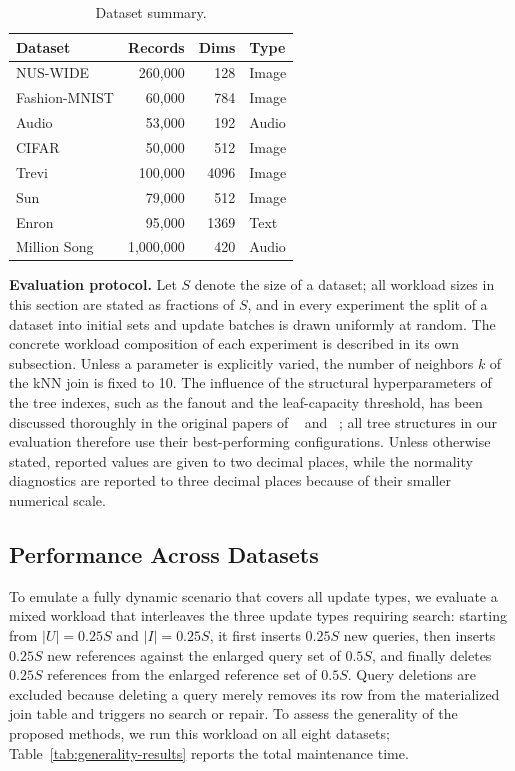 \begin{table}[t]
\centering
\caption{Dataset summary.}
\label{tab:dataset}
\begin{tabular*}{\columnwidth}{@{\extracolsep{\fill}}lrrl@{}}
\toprule
\textbf{Dataset} & \textbf{Records} & \textbf{Dims} & \textbf{Type}\\
\midrule
NUS-WIDE & 260,000 & 128 & Image\\
Fashion-MNIST & 60,000 & 784 & Image\\
Audio & 53,000 & 192 & Audio\\
CIFAR & 50,000 & 512 & Image\\
Trevi & 100,000 & 4096 & Image\\
Sun & 79,000 & 512 & Image\\
Enron & 95,000 & 1369 & Text\\
Million Song & 1,000,000 & 420 & Audio\\
\bottomrule
\end{tabular*}
\end{table}

\noindent\textbf{Evaluation protocol.}
Let $S$ denote the size of a dataset; all workload sizes in this section are stated as fractions of $S$, and in every experiment the split of a dataset into initial sets and update batches is drawn uniformly at random. The concrete workload composition of each experiment is described in its own subsection. Unless a parameter is explicitly varied, the number of neighbors $k$ of the kNN join is fixed to 10. The influence of the structural hyperparameters of the tree indexes, such as the fanout and the leaf-capacity threshold, has been discussed thoroughly in the original papers of \hdrtree~\cite{yang2014continuous} and \deltatree~\cite{cui2003contorting}; all tree structures in our evaluation therefore use their best-performing configurations. Unless otherwise stated, reported values are given to two decimal places, while the normality diagnostics are reported to three decimal places because of their smaller numerical scale.

\subsection{Performance Across Datasets}\label{subsec:exp-overall}

To emulate a fully dynamic scenario that covers all update types, we evaluate a mixed workload that interleaves the three update types requiring search: starting from $|U|=0.25S$ and $|I|=0.25S$, it first inserts $0.25S$ new queries, then inserts $0.25S$ new references against the enlarged query set of $0.5S$, and finally deletes $0.25S$ references from the enlarged reference set of $0.5S$. Query deletions are excluded because deleting a query merely removes its row from the materialized join table and triggers no search or repair. To assess the generality of the proposed methods, we run this workload on all eight datasets; Table~\ref{tab:generality-results} reports the total maintenance time.

